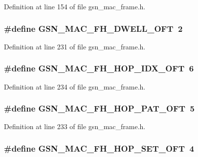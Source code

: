 Definition at line 154 of file gsn\_\-mac\_\-frame.h.

\hypertarget{a00523_a129fee36639b17d10ac7e7dce4b7c298}{
\subsubsection[{GSN\_\-MAC\_\-FH\_\-DWELL\_\-OFT}]{\setlength{\rightskip}{0pt plus 5cm}\#define GSN\_\-MAC\_\-FH\_\-DWELL\_\-OFT~2}}
\label{a00523_a129fee36639b17d10ac7e7dce4b7c298}


Definition at line 231 of file gsn\_\-mac\_\-frame.h.

\hypertarget{a00523_a7df9e04a96bb646538368bb99992b13b}{
\subsubsection[{GSN\_\-MAC\_\-FH\_\-HOP\_\-IDX\_\-OFT}]{\setlength{\rightskip}{0pt plus 5cm}\#define GSN\_\-MAC\_\-FH\_\-HOP\_\-IDX\_\-OFT~6}}
\label{a00523_a7df9e04a96bb646538368bb99992b13b}


Definition at line 234 of file gsn\_\-mac\_\-frame.h.

\hypertarget{a00523_ab89a5bf1506d43e87905502d26e73dad}{
\subsubsection[{GSN\_\-MAC\_\-FH\_\-HOP\_\-PAT\_\-OFT}]{\setlength{\rightskip}{0pt plus 5cm}\#define GSN\_\-MAC\_\-FH\_\-HOP\_\-PAT\_\-OFT~5}}
\label{a00523_ab89a5bf1506d43e87905502d26e73dad}


Definition at line 233 of file gsn\_\-mac\_\-frame.h.

\hypertarget{a00523_a2d15f4295e77b739635f86e495a79ab6}{
\subsubsection[{GSN\_\-MAC\_\-FH\_\-HOP\_\-SET\_\-OFT}]{\setlength{\rightskip}{0pt plus 5cm}\#define GSN\_\-MAC\_\-FH\_\-HOP\_\-SET\_\-OFT~4}}
\label{a00523_a2d15f4295e77b739635f86e495a79ab6}


